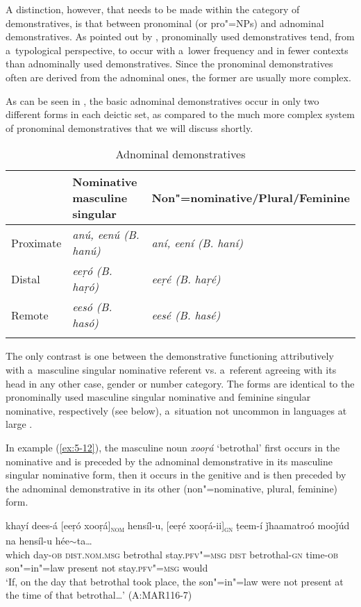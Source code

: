 A distinction, however, that needs to be made within the category of demonstratives, is that between pronominal (or pro"=NPs) and adnominal demonstratives. As pointed out by \citet[206]{himmelmann1996}, pronominally used demonstratives tend, from a~typological perspective, to occur with a~lower frequency and in fewer contexts than adnominally used demonstratives. Since the pronominal demonstratives often are derived from the adnominal ones, the former are usually more complex. 



As can be seen in , the basic adnominal demonstratives occur in only two different forms in each deictic set, as compared to the much more complex system of pronominal demonstratives that we will discuss shortly. 



\begin{table}[ht]
\caption{Adnominal demonstratives}
\begin{tabularx}{\textwidth}{ l@{\hspace{30pt}} Q Q }
\lsptoprule
&
Nominative masculine singular &
Non"=nominative/{\allowbreak}Plural/{\allowbreak}Feminine\\\hline
Proximate &
\textit{anú, eenú (B. hanú)} &
\textit{aní, eení (B. haní)}\\
Distal &
\textit{eeṛó (B. haṛó)} &
\textit{eeṛé (B. haṛé)}\\
Remote &
\textit{eesó (B. hasó)} &
\textit{eesé (B. hasé)}\\\lspbottomrule
\end{tabularx}
\label{tab:5-3}
\end{table}

The only contrast is one between the demonstrative functioning attributively with a~masculine singular nominative referent vs. a~referent agreeing with its head in any other case, gender or number category. The forms are identical to the pronominally used masculine singular nominative and feminine singular nominative, respectively (see below), a~situation not uncommon in languages at large \citep[214]{himmelmann1996}. 


In example (\ref{ex:5-12}), the masculine noun \textit{xooṛá} `betrothal' first occurs in the nominative and is preceded by the adnominal demonstrative in its masculine singular nominative form, then it occurs in the genitive and is then preceded by the adnominal demonstrative in its other (non"=nominative, plural, feminine) form.


\begin{exe}
\ex
\label{ex:5-12}
\gll khayí dees-á [eeṛó xooṛá]\textsc{\textsubscript{nom}} hensíl-u, [eeṛé
 xooṛá-ii]\textsc{\textsubscript{gn}} ṭeem-í ǰhaamatroó mooǰúd na hensíl-u
hée$\sim$ta{\dots} \\
which day-\textsc{ob} \textsc{dist.nom.msg} betrothal stay.\textsc{pfv"=msg}
\textsc{dist} betrothal-\textsc{gn} time-\textsc{ob} son"=in"=law present not stay.\textsc{pfv"=msg} would\\
\glt `If, on the day that betrothal took place, the son"=in"=law were not present at the time of that betrothal{\ldots}' (A:MAR116-7)
\end{exe}

